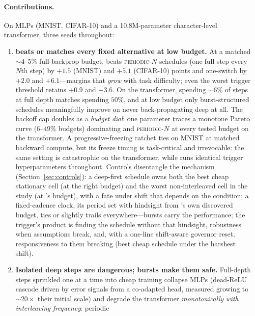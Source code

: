 \paragraph{Contributions.} On MLPs (MNIST, CIFAR-10) and a 10.8M-parameter
character-level transformer, three seeds throughout:
\begin{enumerate}
  \item \textbf{\fw{} beats or matches every fixed alternative at low
  budget.}
  At a matched ${\sim}4$--$5\%$ full-backprop budget, \fw{} beats
  \textsc{periodic}-$N$ schedules (one full step every $N$th step) by
  $+1.5$ (MNIST) and $+5.1$ (CIFAR-10) points and one-switch
  \lpft{} \citep{kumar2022finetuning} by $+2.0$ and $+6.1$---margins that
  \emph{grow} with task difficulty; even the worst trigger threshold
  retains $+0.9$ and $+3.6$. On the transformer, \fw{} spending ${\sim}6\%$ of
  steps at full depth matches \lpft{} spending $50\%$, and at low budget
  only burst-structured schedules meaningfully improve on never
  back-propagating deep at all. The backoff cap doubles as a \emph{budget
  dial}: one parameter traces a monotone Pareto curve ($6$--$49\%$
  budgets) dominating \lpft{} and \textsc{periodic}-$N$ at every tested
  budget on the transformer. A progressive-freezing ratchet \citep{brock2017freezeout,
  liu2021autofreeze} ties \fw{} on MNIST at matched backward compute, but
  its freeze timing is task-critical and irrevocable: the same setting is
  catastrophic on the transformer, while \fw{} runs identical trigger
  hyperparameters throughout. Controls disentangle the mechanism
  (Section~\ref{sec:controls}): a deep-first schedule owns both the best
  cheap stationary cell (at the right budget) and the worst
  non-interleaved cell in the study (at \fw{}'s budget), with a fate under shift that depends on the
  condition; a fixed-cadence clock, its period set with hindsight from
  \fw{}'s own discovered budget, ties or slightly trails \fw{}
  everywhere---bursts carry the performance; the trigger's product is
  finding the schedule without that hindsight, robustness when assumptions
  break, and, with a one-line shift-aware governor reset, responsiveness to
  them breaking (best cheap schedule under the harshest shift).
  \item \textbf{Isolated deep steps are dangerous; bursts make them safe.}
  Full-depth steps sprinkled one at a time into cheap training collapse MLPs
  (dead-ReLU cascade driven by error signals from a co-adapted head, measured
  growing to ${\sim}20\times$ their initial scale) and degrade the
  transformer \emph{monotonically with interleaving frequency}: periodic

\end{enumerate}

